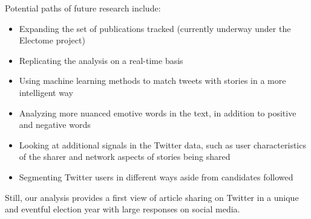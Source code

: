 Potential paths of future research include:
\begin{itemize}
\item Expanding the set of publications tracked (currently underway under the Electome project)
\item Replicating the analysis on a real-time basis
\item Using machine learning methods to match tweets with stories in a more intelligent way
\item Analyzing more nuanced emotive words in the text, in addition to positive and negative words
\item Looking at additional signals in the Twitter data, such as user characteristics of the sharer and network aspects of stories being shared
\item Segmenting Twitter users in different ways aside from candidates followed
 \end{itemize}

Still, our analysis provides a first view of article sharing on Twitter in a unique and eventful election year with large responses on social media.





